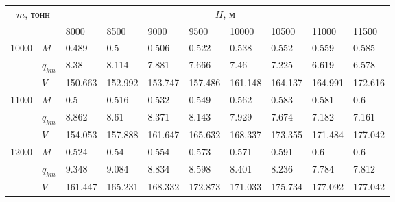 \begin{tabular}{|l|l|llllllll|}\hline
\multicolumn{2}{|c|}{$m$, тонн}& \multicolumn{8}{c|}{$H$, м}\\ 
 \cline{3-10}
 \multicolumn{2}{|c|}{}&                      8000 &                     8500 &                      9000 &                      9500 &                     10000 &    10500 &                     11000 &                     11500 \\
\hline
100.0 & $M$ &                     0.489 &                      0.5 &                     0.506 &                     0.522 &                     0.538 &    0.552 &                     0.559 &    0.585\cellcolor{green} \\
      & $q_{km}$ &                      8.38 &                    8.114 &                     7.881 &                     7.666 &                      7.46 &    7.225 &                     6.619 &    6.578\cellcolor{green} \\
      & $V$ &                   150.663 &                  152.992 &                   153.747 &                   157.486 &                   161.148 &  164.137 &                   164.991 &  172.616\cellcolor{green} \\
\hline
110.0 & $M$ &                       0.5 &                    0.516 &                     0.532 &                     0.549 &                     0.562 &    0.583 &                     0.581 &      0.6\cellcolor{green} \\
      & $q_{km}$ &                     8.862 &                     8.61 &                     8.371 &                     8.143 &                     7.929 &    7.674 &                     7.182 &    7.161\cellcolor{green} \\
      & $V$ &                   154.053 &                  157.888 &                   161.647 &                   165.632 &                   168.337 &  173.355 &                   171.484 &  177.042\cellcolor{green} \\
\hline
120.0 & $M$ &                     0.524 &                     0.54 &                     0.554 &                     0.573 &                     0.571 &    0.591 &      0.6\cellcolor{green} &                       0.6 \\
      & $q_{km}$ &                     9.348 &                    9.084 &                     8.834 &                     8.598 &                     8.401 &    8.236 &    7.784\cellcolor{green} &                     7.812 \\
      & $V$ &                   161.447 &                  165.231 &                   168.332 &                   172.873 &                   171.033 &  175.734 &  177.092\cellcolor{green} &                   177.042 \\

\end{tabular}
